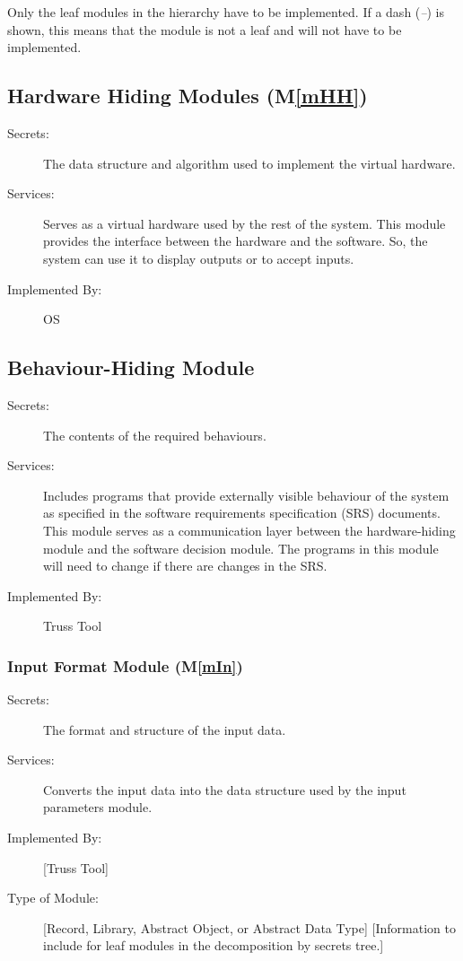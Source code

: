 \documentclass[12pt, titlepage]{article}
\newcommand{\mref}[1]{M\ref{#1}}
\begin{document}
Only the leaf modules in the hierarchy have to be implemented. If a dash
(\emph{--}) is shown, this means that the module is not a leaf and will not have
to be implemented.

\subsection{Hardware Hiding Modules (\mref{mHH})}

\begin{description}
\item[Secrets:]The data structure and algorithm used to implement the virtual
  hardware.
\item[Services:]Serves as a virtual hardware used by the rest of the
  system. This module provides the interface between the hardware and the
  software. So, the system can use it to display outputs or to accept inputs.
\item[Implemented By:] OS
\end{description}

\subsection{Behaviour-Hiding Module}

\begin{description}
\item[Secrets:]The contents of the required behaviours.
\item[Services:]Includes programs that provide externally visible behaviour of
  the system as specified in the software requirements specification (SRS)
  documents. This module serves as a communication layer between the
  hardware-hiding module and the software decision module. The programs in this
  module will need to change if there are changes in the SRS.
\item[Implemented By:] Truss Tool
\end{description}

\subsubsection{Input Format Module (\mref{mIn})}

\begin{description}
\item[Secrets:]The format and structure of the input data.
\item[Services:]Converts the input data into the data structure used by the
  input parameters module.
\item[Implemented By:] [Truss Tool]
\item[Type of Module:] [Record, Library, Abstract Object, or Abstract Data Type]
  [Information to include for leaf modules in the decomposition by secrets tree.]
\end{description}
\end{document}
